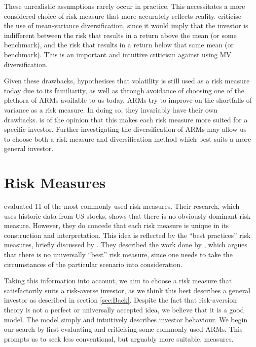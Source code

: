 \documentclass[12pt,a4paper]{article}
\begin{document}
These unrealistic assumptions rarely occur in practice. This necessitates a more considered choice of risk measure that more accurately reflects reality. \cite{byrne2004different} criticise the use of mean-variance diversification, since it would imply that the investor is indifferent between the risk that results in a return above the mean (or some benchmark), and the risk that results in a return below that same mean (or benchmark). This is an important and intuitive criticism against using MV diversification. 

Given these drawbacks, \cite{byrne2004different} hypothesises that volatility is still used as a risk measure today due to its familiarity, as well as through avoidance of choosing one of the plethora of ARMs available to us today. ARMs try to improve on the shortfalls of variance as a risk measure. In doing so, they invariably have their own drawbacks. \cite{righi2017simulation} is of the opinion that this makes each risk measure more suited for a specific investor. Further investigating the diversification of ARMs may allow us to choose both a risk measure and diversification method which best suits a more general investor.

\section{Risk Measures}
\label{sec:Risk}

\cite{righi2017simulation} evaluated 11 of the most commonly used risk measures. Their research, which uses historic data from US stocks, shows that there is no obviously dominant risk measure. However, they do concede that each risk measure is unique in its construction and interpretation. This idea is reflected by the ``best practices'' risk measures, briefly discussed by \cite{dowd2006after}. They described the work done by \citet*{dhaene2003economic}, which argues that there is no universally ``best'' risk measure, since one needs to take the circumstances of the particular scenario into consideration.

Taking this information into account, we aim to choose a risk measure that satisfactorily suits a risk-averse investor, as we think this best describes a general investor as described in section \ref{sec:Back}. Despite the fact that risk-aversion theory is not a perfect or universally accepted idea, we believe that it is a good model. The model simply and intuitively describes investor behaviour. We begin our search by first evaluating and criticising some commonly used ARMs. This prompts us to seek less conventional, but arguably more suitable, measures.
\end{document}
